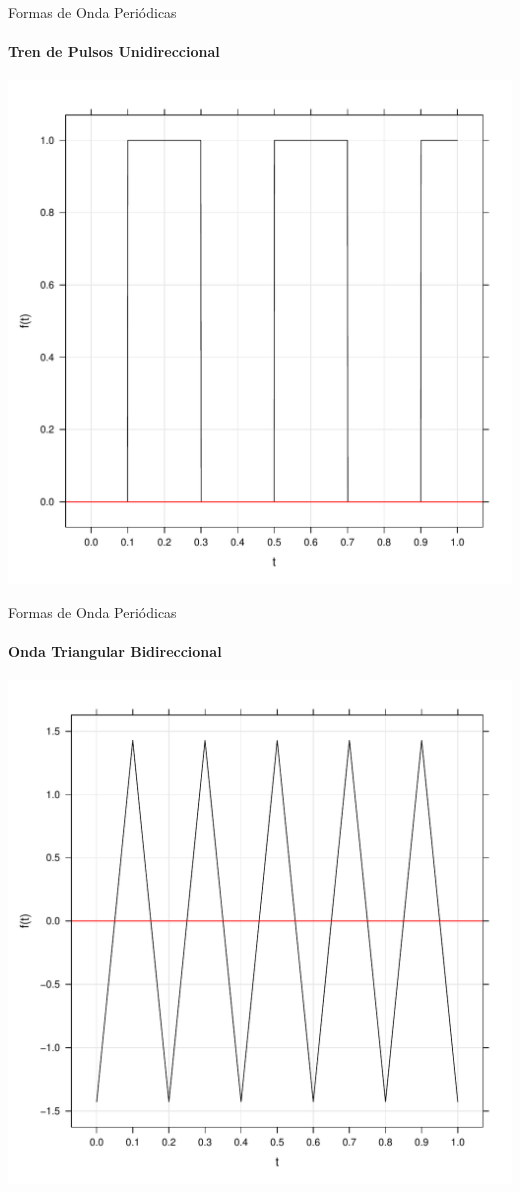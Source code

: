 \documentclass[aspectratio=169, usenames,svgnames,dvipsnames]{beamer}
\begin{document}
\begin{frame}[label={sec:org2eeac9a}]{Formas de Onda Periódicas}
\framesubtitle{Tren de Pulsos Unidireccional}
\begin{center}
\includegraphics[height=0.9\textheight]{../figs/cuadrada0_periodica.pdf}
\end{center}
\end{frame}
\begin{frame}[label={sec:orgb0ef214}]{Formas de Onda Periódicas}
\framesubtitle{Onda Triangular Bidireccional}
\begin{center}
\includegraphics[height=0.9\textheight]{../figs/triangular_periodica.pdf}
\end{center}
\end{frame}
\end{document}
